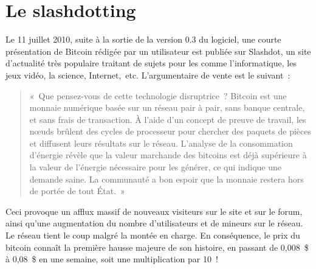 \section*{Le slashdotting}

Le 11 juillet 2010, suite à la sortie de la version 0.3 du logiciel, une courte présentation de Bitcoin rédigée par un utilisateur est publiée sur Slashdot, un site d'actualité très populaire traitant de sujets pour les  comme l'informatique, les jeux vidéo, la science, Internet,~etc. L'argumentaire de vente est le suivant~:

\begin{quote}
«~Que pensez-vous de cette technologie disruptrice~? Bitcoin est une monnaie numérique basée sur un réseau pair à pair, sans banque centrale, et sans frais de transaction. À l'aide d'un concept de preuve de travail, les nœuds brûlent des cycles de processeur pour chercher des paquets de pièces et diffusent leurs résultats sur le réseau. L'analyse de la consommation d'énergie révèle que la valeur marchande des bitcoins est déjà supérieure à la valeur de l'énergie nécessaire pour les générer, ce qui indique une demande saine. La communauté a bon espoir que la monnaie restera hors de portée de tout État.~»
\end{quote}

Ceci provoque un afflux massif de nouveaux visiteurs sur le site et sur le forum, ainsi qu'une augmentation du nombre d'utilisateurs et de mineurs sur le réseau. Le réseau tient le coup malgré la montée en charge. En conséquence, le prix du bitcoin connaît la première hausse majeure de son histoire, en passant de 0,008~\$ à 0,08~\$ en une semaine, soit une multiplication par 10~! %

